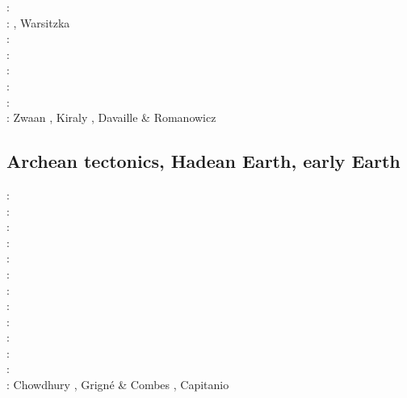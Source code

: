 {\twothousandtwelve: \cite{grmd12}\cite{iadc12}\\
\twothousandthirteen: \cite{luws13}\cite{vadv13}\cite{guhf13}\cite{mibg13}\cite{mesc13}\cite{dusc13}\cite{kern13}, 
                    Warsitzka \etal \cite{wakk13}\\
\twothousandfifteen: \cite{casw15}\cite{rods15}\cite{kiff15}\cite{chsd15}\\
\twothousandsixteen: \cite{scbb16}\cite{chss16}\\
\twothousandseventeen: \cite{casw17}\\
\twothousandeighteen: \cite{pirf18}\\
\twothousandnineteen: \cite{mocb19}\cite{sccs19}\cite{muwm19}\cite{fegb19}\\
\twothousandtwenty: Zwaan \etal \cite{zwsr20}, Kiraly \etal \cite{kiph20},
                    Davaille \& Romanowicz \cite{daro20}
}

\subsection{Archean tectonics, Hadean Earth, early Earth}

\begin{scriptsize}
\nineteeneightyfour: \cite{boas84}\\
\nineteenninetyfour: \cite{vlvv94}\\
\nineteenninetysix: \cite{kafo96}\\
\twothousand: \cite{devv00b}\\
\twothousandfour: \cite{vavv04b}\cite{vavv04}\\
\twothousandsix: \cite{reho06}\\
\twothousandeight: \cite{vava08}\\
\twothousandten: \cite{grpy10}\\
\twothousandfifteen: \cite{maha15}\\
\twothousandsixteen: \cite{onlw16}\cite{fige16}\\
\twothousandseventeen: \cite{onmz17}\\
\twothousandnineteen: \cite{canc19}\cite{gery19}\\
\twothousandtwenty: Chowdhury \etal{} \cite{chcg20}, Grign\'e \& Combes \cite{grco20},
                    Capitanio \etal \cite{canc20}
\end{scriptsize}

